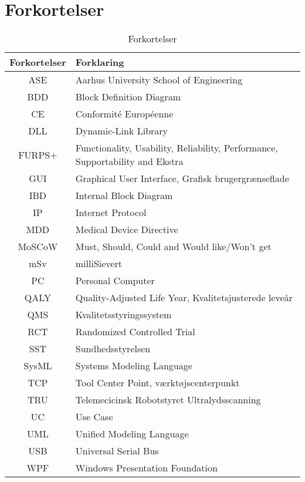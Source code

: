 \chapter{Forkortelser}

\begin{table}[htb]
\centering
\begin{tabular}{ | c | p{} | }
\hline
\textbf{Forkortelser} & \textbf{Forklaring} \\\hline
ASE & Aarhus University School of Engineering \\\hline
BDD & Block Definition Diagram \\\hline
CE & Conformité Européenne\\\hline
DLL & Dynamic-Link Library \\\hline
FURPS+ & Functionality, Usability, Reliability, Performance, Supportability and Ekstra \\\hline
GUI & Graphical User Interface, Grafisk brugergrænseflade \\\hline
IBD & Internal Block Diagram \\\hline
IP & Internet Protocol \\\hline
MDD & Medical Device Directive \\\hline
MoSCoW & Must, Should, Could and Would like/Won't get\\\hline
mSv & milliSievert \\\hline
PC & Personal Computer \\\hline
QALY & Quality-Adjusted Life Year, Kvalitetsjusterede leveår  \\\hline
QMS & Kvalitetsstyringssystem \\\hline
RCT & Randomized Controlled Trial \\\hline
SST & Sundhedsstyrelsen \\\hline
SysML & Systems Modeling Language \\\hline
TCP & Tool Center Point, værktøjscenterpunkt \\\hline
TRU & Telemecicinsk Robotstyret Ultralydsscanning \\\hline
UC & Use Case \\\hline
UML & Unified Modeling Language \\\hline
USB & Universal Serial Bus \\\hline
WPF & Windows Presentation Foundation \\\hline

\end{tabular}
\caption{Forkortelser}
\end{table}

\vspace{3cm}